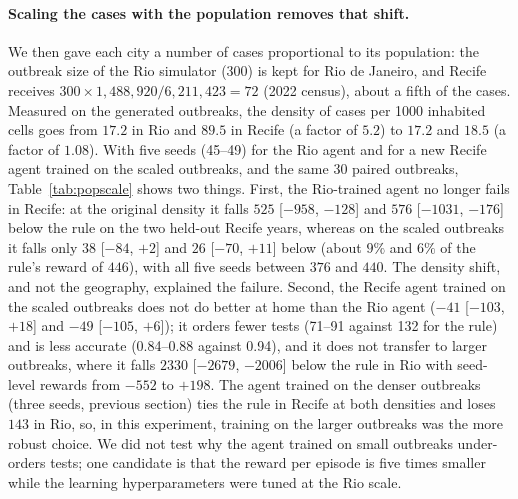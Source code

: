 \documentclass[11pt,a4paper]{article}
\begin{document}
\paragraph{Scaling the cases with the population removes that shift.} We then gave each city a number of cases proportional to its population: the outbreak size of the Rio simulator ($300$) is kept for Rio de Janeiro, and Recife receives $300 \times 1{,}488{,}920 / 6{,}211{,}423 = 72$ (2022 census), about a fifth of the cases. Measured on the generated outbreaks, the density of cases per 1000 inhabited cells goes from $17.2$ in Rio and $89.5$ in Recife (a factor of $5.2$) to $17.2$ and $18.5$ (a factor of $1.08$). With five seeds (45--49) for the Rio agent and for a new Recife agent trained on the scaled outbreaks, and the same 30 paired outbreaks, Table~\ref{tab:popscale} shows two things. First, the Rio-trained agent no longer fails in Recife: at the original density it falls $525$ [$-958$, $-128$] and $576$ [$-1031$, $-176$] below the rule on the two held-out Recife years, whereas on the scaled outbreaks it falls only $38$ [$-84$, $+2$] and $26$ [$-70$, $+11$] below (about $9\%$ and $6\%$ of the rule's reward of $446$), with all five seeds between $376$ and $440$. The density shift, and not the geography, explained the failure. Second, the Recife agent trained on the scaled outbreaks does not do better at home than the Rio agent ($-41$ [$-103$, $+18$] and $-49$ [$-105$, $+6$]); it orders fewer tests (71--91 against 132 for the rule) and is less accurate (0.84--0.88 against 0.94), and it does not transfer to larger outbreaks, where it falls $2330$ [$-2679$, $-2006$] below the rule in Rio with seed-level rewards from $-552$ to $+198$. The agent trained on the denser outbreaks (three seeds, previous section) ties the rule in Recife at both densities and loses $143$ in Rio, so, in this experiment, training on the larger outbreaks was the more robust choice. We did not test why the agent trained on small outbreaks under-orders tests; one candidate is that the reward per episode is five times smaller while the learning hyperparameters were tuned at the Rio scale.
\end{document}
